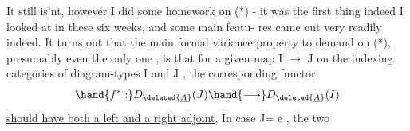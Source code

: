 It still is'nt, however I did some homework on (*) - it was the
first thing indeed I looked at in these six weeks, and some main featu-%
res came out very readily indeed. It turns out that the main formal
variance property to demand on (*), presumably even the only one , is
that for a given map  I $\to$ J on the indexing categories of diagram-types
I and J , the corresponding functor
\[ \hand{f^*:} D_{\deleted{\underline{A}}}(J) \hand{\longrightarrow} D_{\deleted{\underline{A}}}(I) \]
\uline{should have both a left and a right adjoint},  In case J= e , the two
